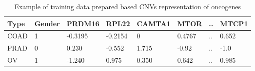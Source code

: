 
\vspace{-2mm}
\begin{table} [!ht]
    \caption{Example of training data prepared based CNVs representation of oncogenes}
    \label{cnv:changed232d}
    \vspace{-6mm}
    \begin{center}
        \scriptsize
        \begin{tabular}{l|l|l|l|l|l|l|l}
            \hline
            \rowcolor{Gray}
            \textbf{Type} & \textbf{Gender} & \textbf{PRDM16} & \textbf{RPL22} & \textbf{CAMTA1} & \textbf{MTOR} & .. & \textbf{MTCP1} \\\hline    
            COAD & 1 & -0.3195 & -0.2154 & 0 & 0.4767  & .. & 0.652 \\\hline
            PRAD & 0 & 0.230 & -0.552 & 1.715 & -0.92  & .. & -1.0 \\\hline
            OV & 1 & -1.240 & 0.975 & 0.350 & 0.642  & .. & 0.985 \\\hline
        \end{tabular}
        \vspace{-6mm}
    \end{center}
\end{table}
\vspace{-3mm}


